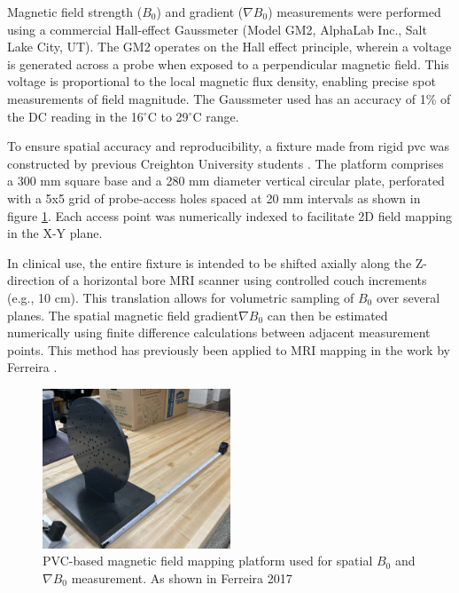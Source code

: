 Magnetic field strength ($B_0$) and gradient ($\nabla B_0$) measurements were performed using a commercial Hall-effect Gaussmeter (Model GM2, AlphaLab Inc., Salt Lake City, UT).  The GM2 operates on the Hall effect principle, wherein a voltage is generated across a probe when exposed to a perpendicular magnetic field. This voltage is proportional to the local magnetic flux density, enabling precise spot measurements of field magnitude. The Gaussmeter used has an accuracy of 1\% of the DC reading in the 16$^\circ$C to 29$^\circ$C range.

To ensure spatial accuracy and reproducibility, a fixture made from rigid \gls{pvc} was constructed by previous Creighton University students \cite{haddixProposal}. The platform comprises a 300 mm square base and a 280 mm diameter vertical circular plate, perforated with a 5x5 grid of probe-access holes spaced at 20 mm intervals as shown in figure \ref{fig:fieldmapping}. Each access point was numerically indexed to facilitate 2D field mapping in the X-Y plane.

In clinical use, the entire fixture is intended to be shifted axially along the Z-direction of a horizontal bore MRI scanner using controlled couch increments (e.g., 10 cm). This translation allows for volumetric sampling of $B_0$ over several planes. The spatial magnetic field gradient$\nabla B_0$ can then be estimated numerically using finite difference calculations between adjacent measurement points. This method has previously been applied to MRI mapping in the work by Ferreira \cite{ferreira2017}.

\begin{figure}[H]
	\centering
	\includegraphics[width=0.5\textwidth]{Assests/Picture3.jpg}
	\caption{PVC-based magnetic field mapping platform used for spatial $B_0$ and $\nabla B_0$ measurement. As shown in Ferreira 2017 \cite{haddixProposal,ferreira2017}}
	\label{fig:fieldmapping}
\end{figure}

